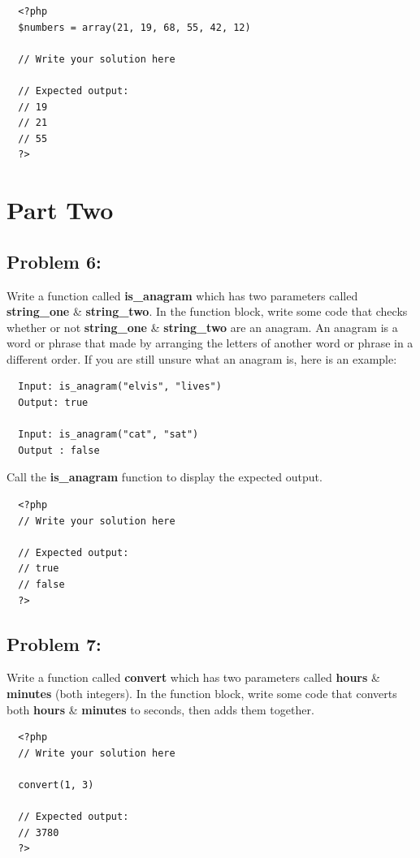 \documentclass{article}
\begin{document}
\begin{verbatim}
  <?php  
  $numbers = array(21, 19, 68, 55, 42, 12) 
  
  // Write your solution here

  // Expected output:
  // 19
  // 21
  // 55
  ?>
\end{verbatim}

\section*{Part Two}

\subsection*{Problem 6:}
Write a function called \textbf{is\_anagram} which has two parameters called \textbf{string\_one} \& \textbf{string\_two}. In the function block, write some code that checks whether or not \textbf{string\_one} \& \textbf{string\_two} are an anagram. An anagram is a word or phrase that made by arranging the letters of another word or phrase in a different order. If you are still unsure what an anagram is, here is an example:

\begin{verbatim}
  Input: is_anagram("elvis", "lives")
  Output: true

  Input: is_anagram("cat", "sat")
  Output : false
\end{verbatim}

Call the \textbf{is\_anagram} function to display the expected output.

\begin{verbatim}
  <?php  
  // Write your solution here

  // Expected output:
  // true
  // false
  ?>
\end{verbatim}

\subsection*{Problem 7:}
Write a function called \textbf{convert} which has two parameters called \textbf{hours} \& \textbf{minutes} (both integers). In the function block, write some code that converts both \textbf{hours} \& \textbf{minutes} to seconds, then adds them together.

\begin{verbatim}
  <?php  
  // Write your solution here

  convert(1, 3)

  // Expected output:
  // 3780
  ?>
\end{verbatim}
\end{document}
